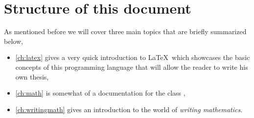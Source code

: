 \section{Structure of this document}
As mentioned before we will cover three main topics that are briefly summarized below, 
\begin{itemize}
\item \cref{ch:latex} gives a very quick introduction to \LaTeX\ which showcases the basic 
concepts of this programming language that will allow the reader to write his own thesis,
\item \cref{ch:math} is somewhat of a documentation for the class \texttt{\classname},
\item \cref{ch:writingmath} gives an introduction to the world of \textit{writing mathematics}.
\end{itemize}